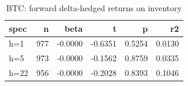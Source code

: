 \begin{table}
\caption{BTC: forward delta-hedged returns on inventory}
\label{tab:t6_dh_returns_BTC}
\begin{tabular}{lrrrrr}
\toprule
spec & n & beta & t & p & r2 \\
\midrule
h=1 & 977 & -0.0000 & -0.6351 & 0.5254 & 0.0130 \\
h=5 & 973 & -0.0000 & -0.1562 & 0.8759 & 0.0335 \\
h=22 & 956 & -0.0000 & -0.2028 & 0.8393 & 0.1046 \\
\bottomrule
\end{tabular}
\end{table}
